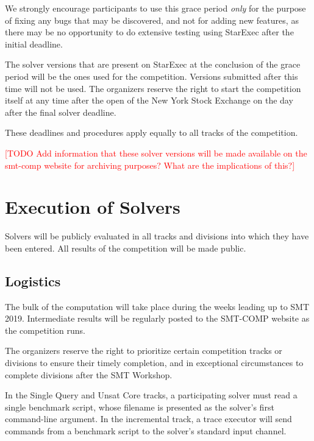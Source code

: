 \documentclass[12pt]{article}
\newcommand{\rem}[1]{\textcolor{red}{[#1]}}
\newcommand{\todo}[1]{\rem{TODO #1}}
\newcommand{\main}{Single Query\xspace}
\newcommand{\ucore}{Unsat Core\xspace}
\begin{document}
We strongly encourage participants to use this grace period
\emph{only} for the purpose of fixing any bugs that may be discovered,
and not for adding new features, as there may be no opportunity to do
extensive testing using StarExec after the initial deadline.

The solver versions that are present on StarExec at the conclusion of
the grace period will be the ones used for the competition.  Versions
submitted after this time will not be used.  The organizers reserve
the right to start the competition itself at any time after the open
of the New York Stock Exchange on the day after the final solver
deadline.

These deadlines and procedures apply equally to all tracks of the
competition.

\todo{Add information that these solver versions will be made available
on the smt-comp website for archiving purposes? What are the implications of
this?}


\section{Execution of Solvers}

Solvers will be publicly evaluated in all tracks and divisions into
which they have been entered.  All results of the competition will be
made public.

\subsection{Logistics}
\label{sec:logistics}

%
The bulk of the computation will take place during the weeks leading
up to SMT 2019.  Intermediate results will be regularly posted to the
SMT-COMP website as the competition runs.

The organizers reserve the right to prioritize certain competition
tracks or divisions to ensure their timely completion, and in
exceptional circumstances to complete divisions after the SMT
Workshop.

%
In the \main and \ucore tracks, a participating solver must read a
single benchmark script, whose filename is presented as the solver's
first command-line argument.  In the incremental track, a trace
executor will send commands from a benchmark script to the solver's
standard input channel.
\end{document}
